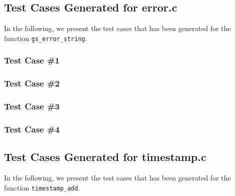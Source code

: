 \newpage
\subsection{Test Cases Generated for error.c}

In the following, we present the test cases that has been generated for the function \texttt{gs\_error\_string}.

\subsubsection{Test Case \#1}


\subsubsection{Test Case \#2}


\subsubsection{Test Case \#3}


\subsubsection{Test Case \#4}




\newpage
\subsection{Test Cases Generated for timestamp.c}

In the following, we present the test cases that has been generated for the function \texttt{timestamp\_add}.

